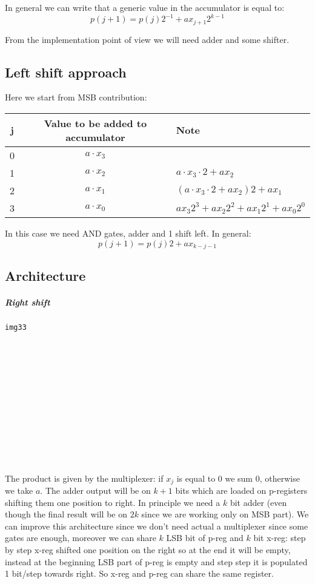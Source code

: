 In general we can write that a generic value in the accumulator is equal to:
   $$p(j+1)=p(j)2^{-1}+ax_{j+1} 2^{k-1}$$

From the implementation point of view we will need adder and some shifter.


\subsection{Left shift approach}
Here we start from MSB contribution:

\begin{center}
  \begin{tabular}{|c|c|l|}
    \hline
    j&  Value to be added to accumulator& Note\\
    \hline
    0&    $a \cdot x_3$& \\
    1&    $a \cdot x_2$& $a \cdot x_3 \cdot 2 + a x_2$  \\
    2&    $a \cdot x_1$& $(a \cdot x_3 \cdot 2 + a x_2) 2 + a x_1$\\
    3&    $a \cdot x_0$& $a x_3 2^3 + a x_2 2^2 + a x_1 2^1+a x_0 2^0$\\
    \hline
  \end{tabular}
\end{center}

In this case we need AND gates, adder and 1 shift left. In general:
$$p(j+1)=p(j)2+ax_{k-j-1}$$

\subsection{Architecture}

\subparagraph{Right shift}

\begin{verbatim}
img33














\end{verbatim}

The product is given by the multiplexer: if $x_j$ is equal to 0 we sum 0, otherwise we take $a$.
The adder output will be on $k+1$ bits which are loaded on p-registers shifting them one position to right. In principle we need a $k$ bit adder (even though the final result will be on $2k$ since we are working only on MSB part). We can improve this architecture since we don't need actual a multiplexer since some gates are enough, moreover we can share $k$ LSB bit of p-reg and $k$ bit x-reg: step by step x-reg shifted one position on the right so at the end it will be empty, instead at the beginning LSB part of p-reg is empty and step step it is populated 1 bit/step towards right. So x-reg and p-reg can share the same register.

